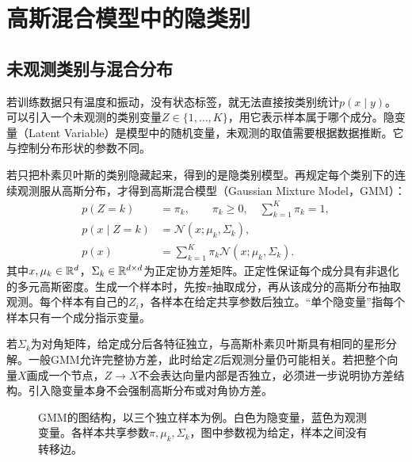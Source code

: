 \section{高斯混合模型中的隐类别}
\subsection{未观测类别与混合分布}
若训练数据只有温度和振动，没有状态标签，就无法直接按类别统计$p(x\mid y)$。可以引入一个未观测的类别变量$Z\in\{1,\ldots,K\}$，用它表示样本属于哪个成分。隐变量（Latent Variable）是模型中的随机变量，未观测的取值需要根据数据推断。它与控制分布形状的参数不同。

若只把朴素贝叶斯的类别隐藏起来，得到的是隐类别模型。再规定每个类别下的连续观测服从高斯分布，才得到高斯混合模型（Gaussian Mixture Model，GMM）：
\begin{align}
 p(Z=k)&=\pi_k,\qquad \pi_k\geq0,\quad\sum_{k=1}^K\pi_k=1,\\
 p(x\mid Z=k)&=\mathcal N(x;\mu_k,\Sigma_k),\\
 p(x)&=\sum_{k=1}^K\pi_k\mathcal N(x;\mu_k,\Sigma_k).
 \label{eq:bayes-gmm-marginal}
\end{align}
其中$x,\mu_k\in\mathbb{R}^d$，$\Sigma_k\in\mathbb{R}^{d\times d}$为正定协方差矩阵。正定性保证每个成分具有非退化的多元高斯密度。生成一个样本时，先按$\pi$抽取成分，再从该成分的高斯分布抽取观测。每个样本有自己的$Z_i$，各样本在给定共享参数后独立。“单个隐变量”指每个样本只有一个成分指示变量。

若$\Sigma_k$为对角矩阵，给定成分后各特征独立，与高斯朴素贝叶斯具有相同的星形分解。一般GMM允许完整协方差，此时给定$Z$后观测分量仍可能相关。若把整个向量$X$画成一个节点，$Z\to X$不会表达向量内部是否独立，必须进一步说明协方差结构。引入隐变量本身不会强制高斯分布或对角协方差。

\begin{figure}[htbp]
\centering
{}
\caption{GMM的图结构，以三个独立样本为例。白色为隐变量，蓝色为观测变量。各样本共享参数$\pi,\mu_k,\Sigma_k$，图中参数视为给定，样本之间没有转移边。}
\label{fig:bayes-gmm-structure}
\end{figure}

